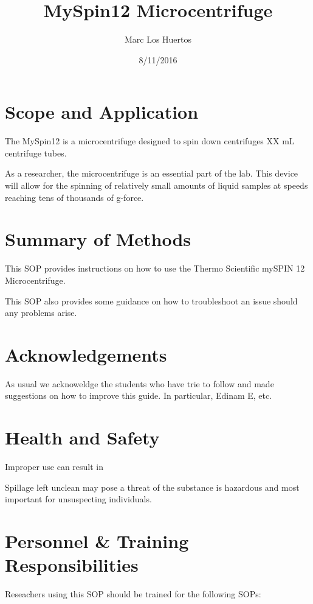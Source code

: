 \documentclass[12pt]{../SOP3_beta}\usepackage[]{graphicx}\usepackage[]{color}
\title{MySpin12 Microcentrifuge}
\date{8/11/2016}
\author{Marc Los Huertos}
\begin{document}
\maketitle

\section{Scope and Application}

\NP The MySpin12 is a microcentrifuge designed to spin down centrifuges XX mL centrifuge tubes.

\NP As a researcher, the microcentrifuge is an essential part of the lab. This device will allow for the spinning of relatively small amounts of liquid samples at speeds reaching tens of thousands of g-force. 

\section{Summary of Methods}

\NP This SOP provides instructions on how to use the Thermo Scientific mySPIN 12 Microcentrifuge. 

\NP This SOP also provides some guidance on how to troubleshoot an issue should any problems arise. 

\tableofcontents

\newpage

\section{Acknowledgements}

\NP As usual we acknoweldge the students who have trie to follow and made suggestions on how to improve this guide. In particular, Edinam E, etc.

\section{Health and Safety}

\NP Improper use can result in 

\NP Spillage left unclean may pose a threat of the substance is hazardous and most important for unsuspecting individuals.


\section{Personnel \& Training Responsibilities}

\NP Reseachers using this SOP should be trained for the following SOPs:
\end{document}
